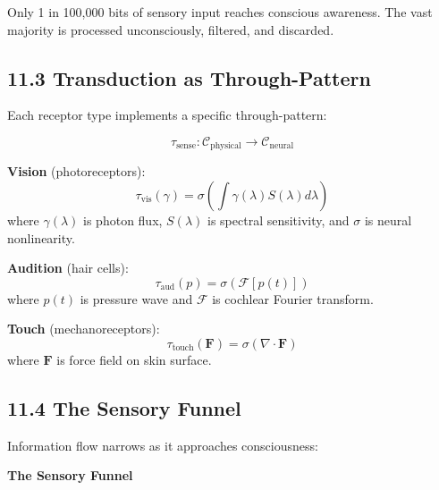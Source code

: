 \documentclass[
  11pt,
  letterpaper,
  twoside,
  openright]{book}
\begin{document}
\begin{tcolorbox}[enhanced jigsaw, coltitle=black, colbacktitle=quarto-callout-important-color!10!white, toprule=.15mm, colframe=quarto-callout-important-color-frame, arc=.35mm, opacityback=0, bottomtitle=1mm, toptitle=1mm, breakable, colback=white, titlerule=0mm, opacitybacktitle=0.6, title=\textcolor{quarto-callout-important-color}{\faExclamation}\hspace{0.5em}{The Consciousness Bottleneck}, rightrule=.15mm, bottomrule=.15mm, leftrule=.75mm, left=2mm]

Only 1 in 100,000 bits of sensory input reaches conscious awareness. The
vast majority is processed unconsciously, filtered, and discarded.

\end{tcolorbox}

\subsection{11.3 Transduction as
Through-Pattern}\label{transduction-as-through-pattern}

Each receptor type implements a specific through-pattern:

\[\tau_{\text{sense}}: \mathcal{C}_{\text{physical}} \to \mathcal{C}_{\text{neural}}\]

\textbf{Vision} (photoreceptors):
\[\tau_{\text{vis}}(\gamma) = \sigma(\int \gamma(\lambda) S(\lambda) d\lambda)\]
where \(\gamma(\lambda)\) is photon flux, \(S(\lambda)\) is spectral
sensitivity, and \(\sigma\) is neural nonlinearity.

\textbf{Audition} (hair cells):
\[\tau_{\text{aud}}(p) = \sigma(\mathcal{F}[p(t)])\] where \(p(t)\) is
pressure wave and \(\mathcal{F}\) is cochlear Fourier transform.

\textbf{Touch} (mechanoreceptors):
\[\tau_{\text{touch}}(\mathbf{F}) = \sigma(\nabla \cdot \mathbf{F})\]
where \(\mathbf{F}\) is force field on skin surface.

\subsection{11.4 The Sensory Funnel}\label{the-sensory-funnel}

Information flow narrows as it approaches consciousness:

\textbf{The Sensory Funnel}
\end{document}
